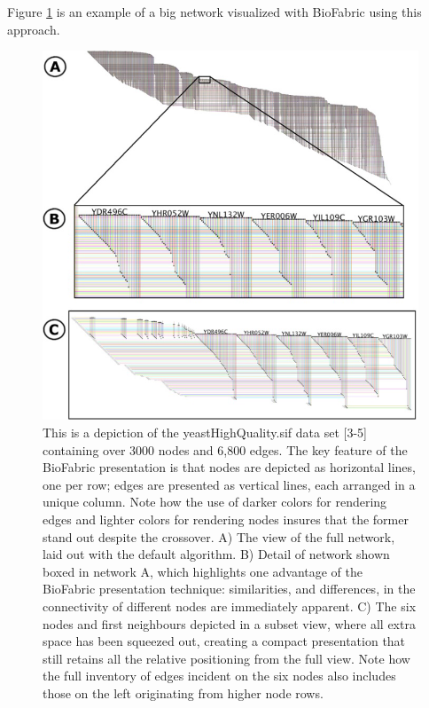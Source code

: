 \documentclass[a4paper,11pt]{kth-mag}
\begin{document}
Figure \ref{fig:bio_default} is an example of a big network visualized with BioFabric using this approach.

\begin{figure}[!htbp]
	\centering
	\includegraphics[scale=0.7]{BIODefault}
	\caption{This is a depiction of the yeastHighQuality.sif data set [3-5] containing over 3000 nodes and 6,800 edges.
The key feature of the BioFabric presentation is that nodes are depicted as horizontal lines, one per row; edges are presented as vertical lines,
each arranged in a unique column. Note how the use of darker colors for rendering edges and lighter colors for rendering nodes insures that the
former stand out despite the crossover. A) The view of the full network, laid out with the default algorithm. B) Detail of network shown boxed in
network A, which highlights one advantage of the BioFabric presentation technique: similarities, and differences, in the connectivity of different
nodes are immediately apparent. C) The six nodes and first neighbours depicted in a subset view, where all extra space has been squeezed out,
creating a compact presentation that still retains all the relative positioning from the full view. Note how the full inventory of edges incident on
the six nodes also includes those on the left originating from higher node rows.}
	\label{fig:bio_default}
\end{figure}
\end{document}
